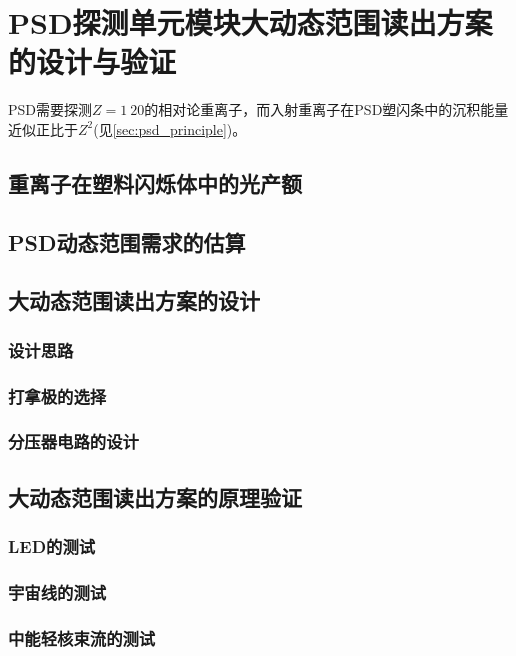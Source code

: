 \chapter{PSD探测单元模块大动态范围读出方案的设计与验证}
\label{ch:large_dynmaicrange}
PSD需要探测$Z=1~20$的相对论重离子，而入射重离子在PSD塑闪条中的沉积能量近似正比于$Z^2$(见\ref{sec:psd_principle})。

\section{重离子在塑料闪烁体中的光产额}
\label{sec:ch3:light_yield}

\section{PSD动态范围需求的估算}

\section{大动态范围读出方案的设计}
\subsection{设计思路}
\subsection{打拿极的选择}
\subsection{分压器电路的设计}

\section{大动态范围读出方案的原理验证}
\subsection{LED的测试}
\subsection{宇宙线的测试}
\subsection{中能轻核束流的测试}